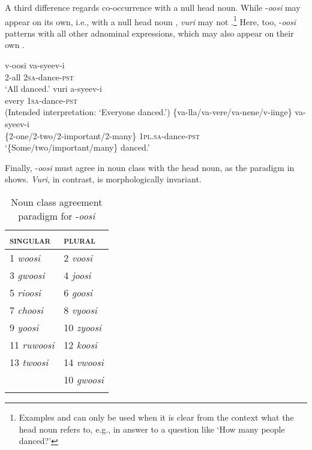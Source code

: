 \documentclass[output=paper]{langsci/langscibook}
\begin{document}
A third difference regards co-occurrence with a null head noun. While -\textit{oosi} may appear on its own, i.e., with a null head noun , \textit{vuri} may not .\footnote{Examples  and  can only be used when it is clear from the context what the head noun refers to, e.g., in answer to a question like ‘How many people danced?’} Here, too, -\textit{oosi} patterns with all other adnominal expressions, which may also appear on their own .

\ea\label{ex:landman:13}
\ea\label{ex:landman:13a}
\gll v-oosi    va-syeev-i      \\
     2-all    2\textsc{sa}-dance-\textsc{pst}\\
\glt ‘All danced.’
\ex\label{ex:landman:13b}
\gll *vuri    a-syeev-i  \\
     every    1\textsc{sa}-dance-\textsc{pst}\\
\glt (Intended interpretation: ‘Everyone danced.’)
\ex\label{ex:landman:13c}
\gll \{va-lla/va-vere/va-nene/v-iinge\}  va-syeev-i\\
     \{2-one/2-two/2-important/2-many\}  1\textsc{pl}.\textsc{sa}-dance-\textsc{pst}\\
\glt ‘\{Some/two/important/many\} danced.’
\z
\z

  Finally, -\textit{oosi} must agree in noun class with the head noun, as the paradigm in  shows. \textit{Vuri}, in contrast, is morphologically invariant.

\begin{table}
\caption{Noun class agreement paradigm for -\textit{oosi}}
\label{tab:Landman:1}
\begin{tabularx}{.5\textwidth}{XX}
\lsptoprule
\textsc{singular} & \textsc{plural}\\
\midrule
1  \textit{woosi} & 2  \textit{voosi}\\

3  \textit{gwoosi} & 4  \textit{joosi}\\

5  \textit{rioosi} & 6  \textit{goosi}\\

7  \textit{choosi} & 8  \textit{vyoosi} \\

9  \textit{yoosi} & 10  \textit{zyoosi} \\

11  \textit{ruwoosi} & 12  \textit{koosi}\\

13  \textit{twoosi} & 14  \textit{vwoosi}\\

& 10  \textit{gwoosi}\\
\lspbottomrule
\end{tabularx}
\end{table}
\end{document}
